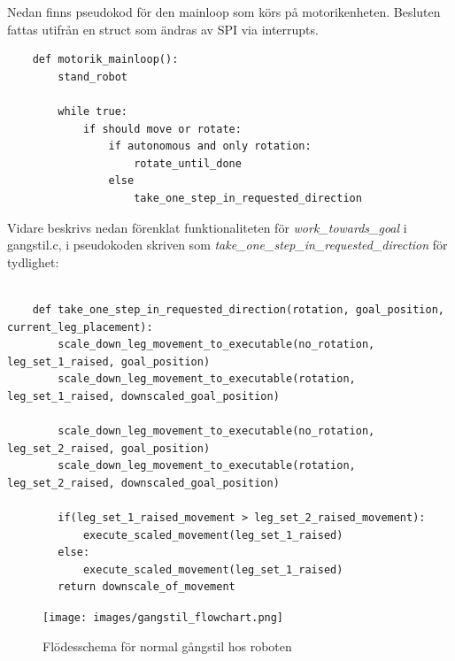 \documentclass[a4paper,titlepage,12pt]{article}
\begin{document}

    	Nedan finns pseudokod för den mainloop som körs på motorikenheten. Besluten fattas 
	utifrån en struct som ändras av SPI via interrupts.

	\begin{lstlisting}
	def motorik_mainloop():
        stand_robot

        while true:
            if should move or rotate:
                if autonomous and only rotation:
                    rotate_until_done
                else
                    take_one_step_in_requested_direction
	\end{lstlisting}
	
    Vidare beskrivs nedan förenklat funktionaliteten för
    \textit{work\_towards\_goal} i gangstil.c, i pseudokoden skriven 
    som \textit{take\_one\_step\_in\_requested\_direction} för tydlighet:

	\begin{lstlisting}
	
	def take_one_step_in_requested_direction(rotation, goal_position, current_leg_placement):
		scale_down_leg_movement_to_executable(no_rotation, leg_set_1_raised, goal_position)
		scale_down_leg_movement_to_executable(rotation, leg_set_1_raised, downscaled_goal_position)

		scale_down_leg_movement_to_executable(no_rotation, leg_set_2_raised, goal_position)
		scale_down_leg_movement_to_executable(rotation, leg_set_2_raised, downscaled_goal_position)

		if(leg_set_1_raised_movement > leg_set_2_raised_movement):
			execute_scaled_movement(leg_set_1_raised)
		else:
			execute_scaled_movement(leg_set_1_raised)
		return downscale_of_movement
	\end{lstlisting}

	\begin{figure}[h]
		\centering
		\texttt{[image: images/gangstil\_flowchart.png]}
		\caption{Flödesschema för normal gångstil hos roboten
        \label{fig:walkflow0}}
	\end{figure}
\end{document}
